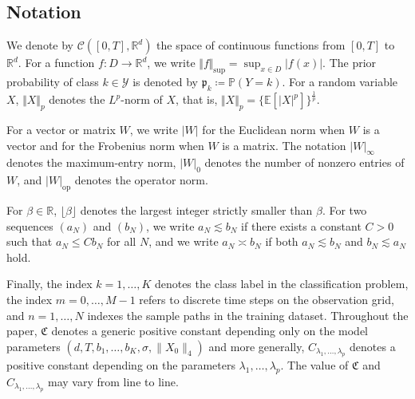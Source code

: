\documentclass{article}
\theoremstyle{plain}
\theoremstyle{definition}
\theoremstyle{remark}
\newcommand{\RR}{\mathbb{R}}
\newcommand{\EE}{\mathbb{E}}
\begin{document}





\subsection{Notation}\label{sec:notations}


We denote by $\mathcal{C}([0,T], \mathbb{R}^d)$ the space of continuous functions from $[0,T]$ to $\mathbb{R}^d$. For a function $f:D\rightarrow \RR^d$, we write $\Vert f\Vert _{\sup}=\sup_{x\in D}|f(x)|$.  The prior probability of class $k\in\mathcal{Y}$ is denoted by
$\mathfrak{p}_k \coloneqq \mathbb{P}(Y = k)$. For a random variable $X$, $\Vert X\Vert_p$ denotes the $L^p$-norm of $X$, that is, $\Vert X\Vert_p=\{\EE [|X|^p]\}^{\frac{1}{p}}.$ 

For a vector or matrix $W$, we write $|W|$ for the Euclidean norm when $W$ is a vector and for the Frobenius norm when $W$ is a matrix. The notation $|W|_\infty$ denotes the maximum-entry norm, $|W|_0$ denotes the number of nonzero entries of $W$, and $|W|_{\text{op}}$ denotes the operator norm. 

For $\beta \in \mathbb{R}$, $\lfloor \beta \rfloor$ denotes the largest integer strictly smaller than $\beta$.  
For two sequences $(a_N)$ and $(b_N)$, we write $a_N \lesssim b_N$ if there exists a constant $C>0$ such that $a_N \le C b_N$ for all $N$, and we write $a_N \asymp b_N$ if both $a_N \lesssim b_N$ and $b_N \lesssim a_N$ hold.

Finally, the index $k = 1,\dots,K$ denotes the class label in the classification problem, the index $m = 0,\dots,M-1$ refers to discrete time steps on the observation grid, and $n = 1,\dots,N$ indexes the sample paths in the training dataset. %
Throughout the paper, $\mathfrak{C}$ denotes a generic positive constant depending only on the model parameters $(d,T,b_1,\ldots,b_K,\sigma,\|X_0\|_4)$ and more generally, $C_{\lambda_1,\ldots,\lambda_p}$ denotes a positive constant depending on the parameters $\lambda_1,\ldots,\lambda_p$. The value of $\mathfrak{C}$ and $C_{\lambda_1,\ldots,\lambda_p}$ may  vary from line to line.
\end{document}
